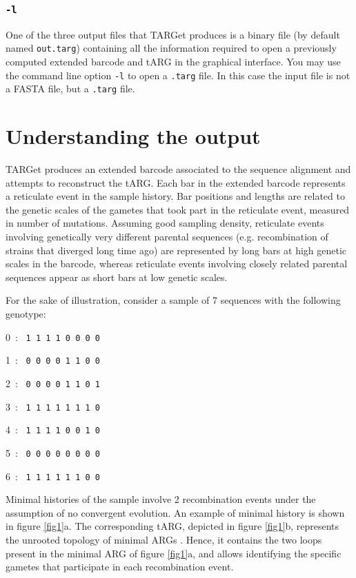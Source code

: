 \documentclass[12pt]{article}
\begin{document}
\subsubsection*{\texttt{-l}}

One of the three output files that TARGet produces is a binary file (by default named \texttt{out.targ}) containing all the information required to open a previously computed extended barcode and tARG in the graphical interface. You may use the command line option \texttt{-l} to open a \texttt{.targ} file. In this case the input file is not a FASTA file, but a \texttt{.targ} file.

\section{Understanding the output}

TARGet produces an extended barcode associated to the sequence alignment and attempts to reconstruct the tARG. Each bar in the extended barcode represents a reticulate event in the sample history. Bar positions and lengths are related to the genetic scales of the gametes that took part in the reticulate event, measured in number of mutations. Assuming good sampling density, reticulate events involving genetically very different parental sequences (e.g. recombination of strains that diverged long time ago) are represented by long bars at high genetic scales in the barcode, whereas reticulate events involving closely related parental sequences appear as short bars at low genetic scales.

For the sake of illustration, consider a sample of 7 sequences with the following genotype:

0\ : \ \texttt{1 1 1 1 0 0 0 0}

1\ : \ \texttt{0 0 0 0 1 1 0 0}

2\ : \ \texttt{0 0 0 0 1 1 0 1}

3\ : \ \texttt{1 1 1 1 1 1 1 0}

4\ : \ \texttt{1 1 1 1 0 0 1 0}

5\ : \ \texttt{0 0 0 0 0 0 0 0}

6\ : \ \texttt{1 1 1 1 1 1 0 0}

\noindent Minimal histories of the sample involve 2 recombination events under the assumption of no convergent evolution. An example of minimal history is shown in figure \ref{fig1}a. The corresponding tARG, depicted in figure \ref{fig1}b, represents the unrooted topology of minimal ARGs \cite{target}. Hence, it contains the two loops present in the minimal ARG of figure \ref{fig1}a, and allows identifying the specific gametes that participate in each recombination event. 
\end{document}
